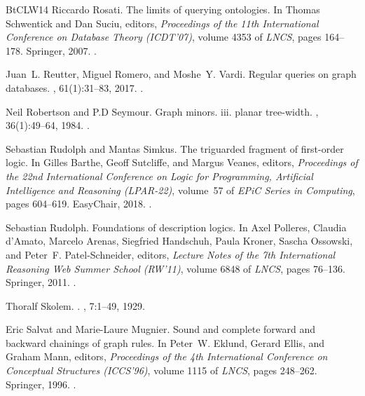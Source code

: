 \documentclass[10pt,a4paper]{amsart}
\theoremstyle{definition}
\numberwithin{equation}{section}
\theoremstyle{plain}
\theoremstyle{definition}
\theoremstyle{myexample}
\theoremstyle{plain}
\theoremstyle{definition}
\begin{document}
\begin{thebibliography}{BtCLW14}
Riccardo Rosati.
\newblock The limits of querying ontologies.
\newblock In Thomas Schwentick and Dan Suciu, editors, {\em Proceedings of the
  11th International Conference on Database Theory ({ICDT}'07)}, volume 4353 of
  {\em LNCS}, pages 164--178. Springer, 2007.
\newblock \href {https://doi.org/10.1007/11965893_12}
  {}.

Juan~L. Reutter, Miguel Romero, and Moshe~Y. Vardi.
\newblock Regular queries on graph databases.
, 61(1):31--83, 2017.
\newblock \href {https://doi.org/10.1007/s00224-016-9676-2}
  {}.

Neil Robertson and P.D Seymour.
\newblock Graph minors. iii. planar tree-width.
, 36(1):49--64, 1984.
\newblock \href {https://doi.org/10.1016/0095-8956(84)90013-3}
  {}.

Sebastian Rudolph and Mantas Simkus.
\newblock The triguarded fragment of first-order logic.
\newblock In Gilles Barthe, Geoff Sutcliffe, and Margus Veanes, editors, {\em
  Proceedings of the 22nd International Conference on Logic for Programming,
  Artificial Intelligence and Reasoning ({LPAR-22})}, volume~57 of {\em EPiC
  Series in Computing}, pages 604--619. EasyChair, 2018.
\newblock \href {https://doi.org/10.29007/m8ts} {}.

Sebastian Rudolph.
\newblock Foundations of description logics.
\newblock In Axel Polleres, Claudia d'Amato, Marcelo Arenas, Siegfried
  Handschuh, Paula Kroner, Sascha Ossowski, and Peter~F. Patel{-}Schneider,
  editors, {\em Lecture Notes of the 7th International Reasoning Web Summer
  School ({RW}'11)}, volume 6848 of {\em LNCS}, pages 76--136. Springer, 2011.
\newblock \href {https://doi.org/10.1007/978-3-642-23032-5_2}
  {}.

Thoralf Skolem.
.
, 7:1--49, 1929.

Eric Salvat and Marie-Laure Mugnier.
\newblock Sound and complete forward and backward chainings of graph rules.
\newblock In Peter~W. Eklund, Gerard Ellis, and Graham Mann, editors, {\em
  Proceedings of the 4th International Conference on Conceptual Structures
  (ICCS'96)}, volume 1115 of {\em LNCS}, pages 248--262. Springer, 1996.
\newblock \href {https://doi.org/10.1007/3-540-61534-2_16}
  {}.


\end{thebibliography}
\end{document}
